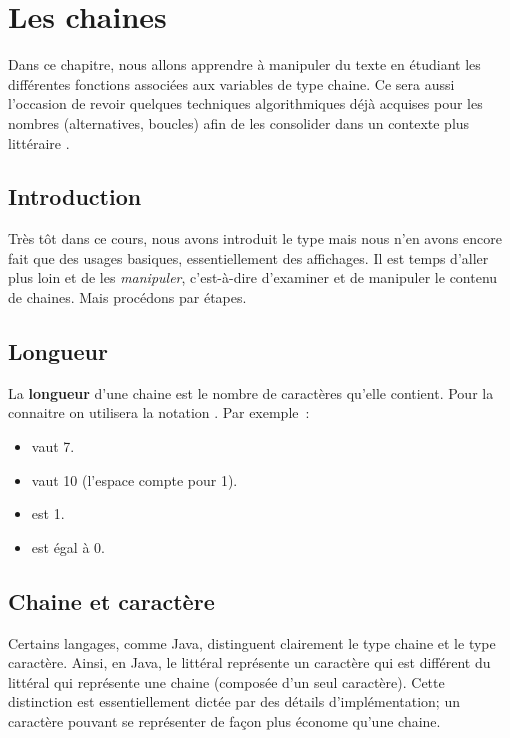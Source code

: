 \chapter{Les chaines}

	Dans ce chapitre, 
	nous allons apprendre à manipuler du texte 
	en étudiant les différentes fonctions associées 
	aux variables de type chaine. 
	Ce sera aussi l’occasion de revoir quelques techniques algorithmiques 
	déjà acquises pour les nombres (alternatives, boucles) 
	afin de les consolider dans un contexte plus \og littéraire \fg.
	
\section{Introduction}

	Très tôt dans ce cours,
	nous avons introduit le type 
	mais nous n’en avons encore fait que des usages basiques,
	essentiellement des affichages.
	Il est temps d’aller plus loin et de les \emph{manipuler},
	c’est-à-dire d’examiner et de manipuler le contenu de chaines. 
	Mais procédons par étapes.
	
\section{Longueur}
	
	La \textbf{longueur} d’une chaine est le nombre de caractères
	qu’elle contient. 
	Pour la connaitre on utilisera la notation .
	Par exemple~:
	\begin{itemize}
	\item {} vaut 7.
	\item {} vaut 10 (l’espace compte pour 1).
	\item {} est 1.
	\item {} est égal à 0.
	\end{itemize}
	
\section{Chaine et caractère}

	Certains langages, comme Java,
	distinguent clairement le type chaine et le type caractère.
	Ainsi, en Java, le littéral  représente un caractère
	qui est différent du littéral  qui représente une chaine
	(composée d’un seul caractère).
	Cette distinction est essentiellement dictée par des détails
	d’implémentation; un caractère pouvant se représenter
	de façon plus économe qu’une chaine.

